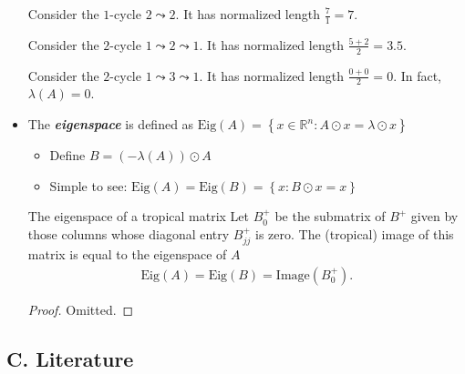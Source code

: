 \documentclass{article}
\begin{document}
\begin{itemize}
\begin{example*}{}{}
\begin{tikzpicture}[x=0.75pt,y=0.75pt,yscale=-0.4,xscale=0.4]
\end{tikzpicture}

		Consider the \( 1 \)-cycle \( 2 \leadsto 2 \). It has normalized length \( \frac{7}{1} = 7 \).

		Consider the \( 2 \)-cycle \( 1 \leadsto 2 \leadsto 1 \). It has normalized length \( \frac{5 + 2}{2} = 3.5 \).

		Consider the \( 2 \)-cycle \( 1 \leadsto 3 \leadsto 1 \). It has normalized length \( \frac{0 + 0}{2} = 0 \). In fact, \( \lambda(A) = 0 \).
	\end{example*}

	\item The \textbf{\textit{eigenspace}} is defined as \( \mathrm{Eig}(A) = \left\{ x \in \mathbb{R}^n : A \odot x = \lambda \odot x \right\} \)
		\begin{itemize}
			\item Define \( B = (-\lambda(A)) \odot A \)
   		\item Simple to see: \( \mathrm{Eig}(A) = \mathrm{Eig}(B) = \left\{ x : B \odot x = x \right\} \)
		\end{itemize}
 
	\begin{theorem*}{The eigenspace of a tropical matrix  \cite[Thm. 7.13]{inv2nonlinearalgebra}}{}
		Let \( B^+_0 \) be the submatrix of \( B^+ \) given by those columns whose diagonal entry \( B_{jj}^+ \) is zero. The (tropical) image of this matrix is equal to the eigenspace of \( A \)
		\begin{align*}
			\mathrm{Eig}(A) = \mathrm{Eig}(B) = \mathrm{Image}(B^+_0).
		\end{align*}
	\end{theorem*}

	\begin{proof}
		Omitted.
	\end{proof}
\end{itemize}

\subsection*{C. Literature}


\end{document}
